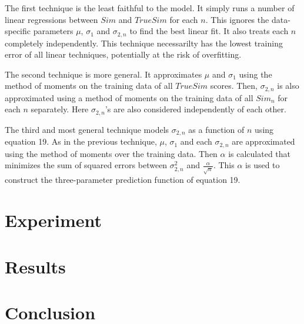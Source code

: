 \documentclass[10pt]{article}
\begin{document}
The first technique is the least faithful to the model. It simply runs a number
of linear regressions between $Sim$ and $TrueSim$ for each $n$. This ignores the 
data-specific parameters $\mu$, $\sigma_{1}$ and $\sigma_{2,n}$ to find the best 
linear fit. It also treats each $n$ completely independently. This technique 
necessarilty has the lowest training error of all linear techniques, potentially 
at the risk of overfitting.

The second technique is more general. It approximates $\mu$ and $\sigma_{1}$
using the method of moments on the training data of all $TrueSim$ scores. Then,
$\sigma_{2,n}$ is also approximated using a method of moments on the training
data of all $Sim_n$ for each $n$ separately. Here $\sigma_{2,n}$'s are also
considered independently of each other.

The third and most general technique models $\sigma_{2,n}$ as a function of
$n$ using equation 19. As in the previous technique, $\mu$, $\sigma_{1}$ and each
$\sigma_{2,n}$ are approximated using the method of moments over the training
data. Then $\alpha$ is calculated that minimizes the sum of squared errors
between $\sigma_{2,n}^2$ and $\frac{\alpha}{\sqrt{n}}$. This $\alpha$ is used to
construct the three-parameter prediction function of equation 19.

\section*{Experiment}

\section*{Results}

\section*{Conclusion}
\end{document}
